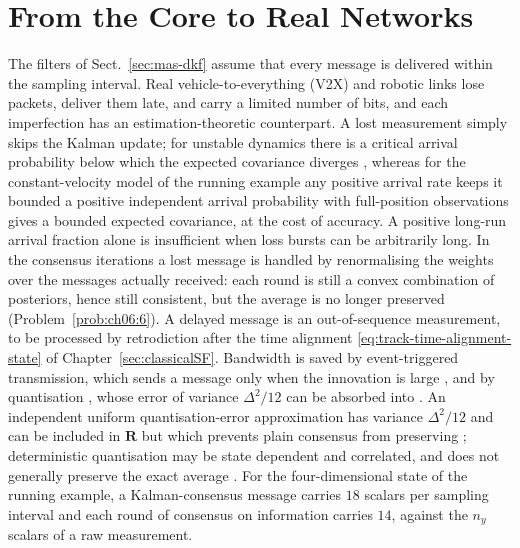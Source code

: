 \documentclass[graybox,envcountchap]{style/SNmono}
\providecommand{\DIFadd}[1]{{\protect\color{blue} #1}} %
\providecommand{\DIFdel}[1]{{\protect\color{red} #1}} %
\providecommand{\DIFaddbegin}{} %
\providecommand{\DIFaddend}{} %
\providecommand{\DIFdelbegin}{} %
\providecommand{\DIFdelend}{} %
\begin{document}
\section{From the Core to Real Networks}
\label{sec:mas-real-networks}

The filters of Sect.~\ref{sec:mas-dkf} assume that every message is delivered within the sampling interval. Real vehicle-to-everything (V2X) and robotic links lose packets, deliver them late, and carry a limited number of bits, and each imperfection has an estimation-theoretic counterpart. A lost measurement simply skips the Kalman update; for unstable dynamics there is a critical arrival probability below which the expected covariance diverges \cite{sinopoli2004_intermittent}, whereas for the constant-velocity model of the running example \DIFdelbegin \DIFdel{any positive arrival rate keeps it bounded }\DIFdelend \DIFaddbegin \DIFadd{a positive independent arrival probability with full-position observations gives a bounded expected covariance}\DIFaddend , at the cost of accuracy. \DIFaddbegin \DIFadd{A positive long-run arrival fraction alone is insufficient when loss bursts can be arbitrarily long. }\DIFaddend In the consensus iterations a lost message is handled by renormalising the weights over the messages actually received: each round is still a convex combination of posteriors, hence still consistent, but the average is no longer preserved (Problem~\ref{prob:ch06:6}). A delayed message is an out-of-sequence measurement, to be processed by retrodiction \cite{barshalom2002_oosm} after the time alignment \eqref{eq:track-time-alignment-state} of Chapter~\ref{sec:classicalSF}. Bandwidth is saved by event-triggered transmission, which sends a message only when the innovation is large \cite{trimpe2014_event_based}, and by quantisation\DIFdelbegin \DIFdel{, whose error of variance $\Delta^{2}/12$ can be absorbed into }\DIFdelend \DIFaddbegin \DIFadd{. An independent uniform quantisation-error approximation has variance $\Delta^2/12$ and can be included in }\DIFaddend $\mathbf{R}$\DIFdelbegin \DIFdel{but which prevents plain consensus from preserving }\DIFdelend \DIFaddbegin \DIFadd{; deterministic quantisation may be state dependent and correlated, and does not generally preserve }\DIFaddend the exact average \cite{kashyap2007_quantized}. For the four-dimensional state of the running example, a Kalman-consensus message carries $18$ scalars per sampling interval and each round of consensus on information carries $14$, against the $n_y$ scalars of a raw measurement.
\end{document}
